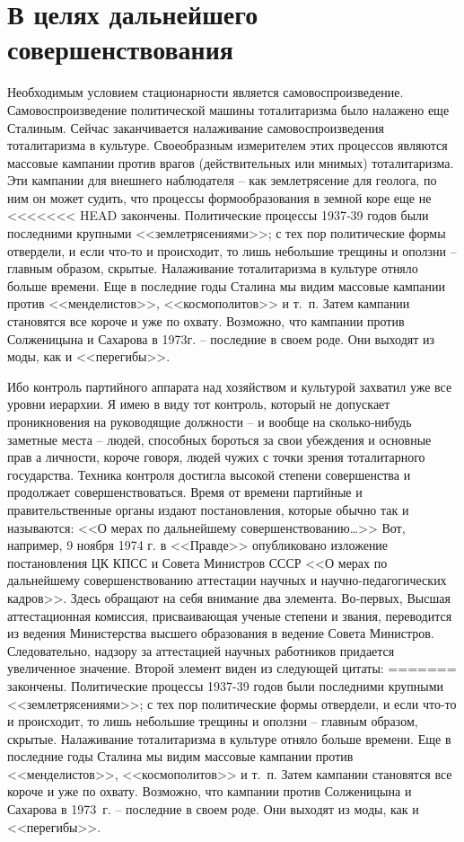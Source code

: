 \documentclass{book}
\begin{document}
\section{В целях дальнейшего совершенствования}

Необходимым условием стационарности является самовоспроизведение. Самовоспроизведение политической машины тоталитаризма было 
налажено еще Сталиным. Сейчас заканчивается налаживание самовоспроизведения тоталитаризма в культуре. Своеобразным измерителем 
этих процессов являются массовые кампании  против врагов (действительных или мнимых) тоталитаризма. Эти кампании для внешнего 
наблюдателя -- как землетрясение для геолога, по ним он может судить, что процессы формообразования в земной коре еще не 
<<<<<<< HEAD
закончены. Политические процессы 1937‑39 годов были последними крупными <<землетрясениями>>; с тех пор полити­ческие формы 
отвердели, и если что‑то и происходит, то лишь небольшие трещины и оползни -- главным образом, скрытые. Налаживание 
тоталитаризма в культуре отняло больше времени. Еще в последние годы Сталина мы видим массовые кампании против <<менделистов>>, 
<<космополитов>> и т.~п. Затем кампании становятся все короче и уже по охвату. Возможно, что кампании против Солженицына и 
Сахарова в 1973г. -- последние в своем роде. Они выходят из моды, как и <<перегибы>>.

Ибо контроль партийного аппарата над хозяйством и культурой захватил уже все уровни иерархии. Я имею в виду тот контроль, который не допускает проникновения на руководящие должности -- и вообще на сколько‑нибудь заметные места -- людей, способных бороться за свои убеждения и основные прав а личности, короче говоря, людей чужих с  точки зрения тоталитарного государства. Техника контроля достигла высокой степени совершенства и продолжает совершенствоваться. Время от времени партийные и правительственные органы издают постановления, которые обычно так и называются: <<О мерах по дальнейшему совершенствованию\ldots>> Вот, например, 9 ноября 1974 г. в <<Правде>> опубликовано изложение постановления ЦК КПСС и Совета Министров СССР <<О мерах по дальнейшему совершенствованию аттестации научных и научно‑педагогических кадров>>. Здесь обращают на себя внимание два элемента. Во‑первых, Высшая аттестационная комиссия, присваивающая ученые степени и звания, переводится из ведения Министерства высшего образования в ведение Совета Министров. Следовательно, надзору за аттестацией научных работников придается увеличенное значение. Второй элемент виден из следующей цитаты:
=======
закончены. Политические процессы 1937-39 годов были последними крупными <<землетрясениями>>; с тех пор полити­ческие формы 
отвердели, и если что-то и происходит, то лишь небольшие трещины и оползни -- главным образом, скрытые. Налаживание 
тоталитаризма в культуре отняло больше времени. Еще в последние годы Сталина мы видим массовые кампании против <<менделистов>>, 
<<космополитов>> и т.~п. Затем кампании становятся все короче и уже по охвату. Возможно, что кампании против Солженицына и 
Сахарова в 1973~г. -- последние в своем роде. Они выходят из моды, как и <<перегибы>>.
\end{document}
